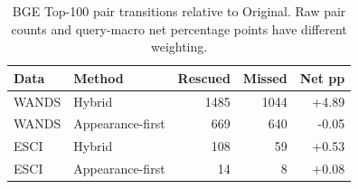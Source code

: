 \begin{table}[htbp]
\caption{BGE Top-100 pair transitions relative to Original. Raw pair counts and query-macro net percentage points have different weighting.}\label{tab:transitions}
\centering\small
\begin{tabular}{llrrr}\toprule
Data & Method & Rescued & Missed & Net pp\\\midrule
WANDS & Hybrid & 1485 & 1044 & +4.89\\
WANDS & Appearance-first & 669 & 640 & -0.05\\
ESCI & Hybrid & 108 & 59 & +0.53\\
ESCI & Appearance-first & 14 & 8 & +0.08\\
\bottomrule\end{tabular}
\end{table}
